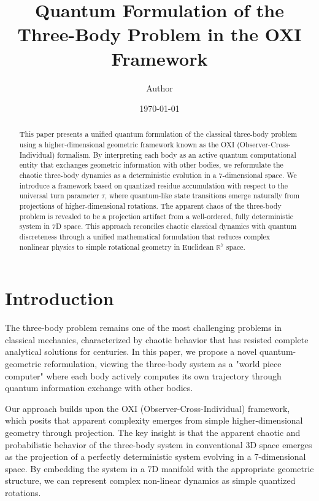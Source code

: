 \documentclass{article}
\title{Quantum Formulation of the Three-Body Problem in the OXI Framework}
\author{Author}
\date{\today}
\begin{document}
\maketitle

\begin{abstract}
This paper presents a unified quantum formulation of the classical three-body problem using a higher-dimensional geometric framework known as the OXI (Observer-Cross-Individual) formalism. By interpreting each body as an active quantum computational entity that exchanges geometric information with other bodies, we reformulate the chaotic three-body dynamics as a deterministic evolution in a 7-dimensional space. We introduce a framework based on quantized residue accumulation with respect to the universal turn parameter $\tau$, where quantum-like state transitions emerge naturally from projections of higher-dimensional rotations. The apparent chaos of the three-body problem is revealed to be a projection artifact from a well-ordered, fully deterministic system in 7D space. This approach reconciles chaotic classical dynamics with quantum discreteness through a unified mathematical formulation that reduces complex nonlinear physics to simple rotational geometry in Euclidean $\mathbb{R}^7$ space.
\end{abstract}

\section{Introduction}

The three-body problem remains one of the most challenging problems in classical mechanics, characterized by chaotic behavior that has resisted complete analytical solutions for centuries. In this paper, we propose a novel quantum-geometric reformulation, viewing the three-body system as a "world piece computer" where each body actively computes its own trajectory through quantum information exchange with other bodies.

Our approach builds upon the OXI (Observer-Cross-Individual) framework, which posits that apparent complexity emerges from simple higher-dimensional geometry through projection. The key insight is that the apparent chaotic and probabilistic behavior of the three-body system in conventional 3D space emerges as the projection of a perfectly deterministic system evolving in a 7-dimensional space. By embedding the system in a 7D manifold with the appropriate geometric structure, we can represent complex non-linear dynamics as simple quantized rotations.
\end{document}

